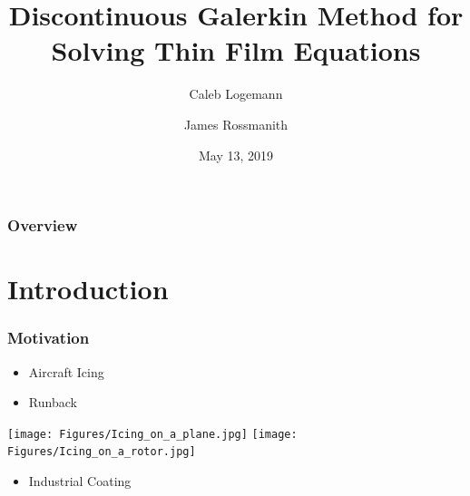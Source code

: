 \documentclass[10pt]{beamer}
\title[]{Discontinuous Galerkin Method for Solving Thin Film Equations} %
\author{Caleb Logemann \and James Rossmanith} %
\institute[Iowa State University]{%
Mathematics Department,\\ Iowa State University \\ %
\medskip
\textit{logemann@iastate.edu}} %
\date{May 13, 2019} %
\begin{document}
  \begin{frame}
    \titlepage{}
  \end{frame}

  \begin{frame}
    \frametitle{Overview}
    \tableofcontents
  \end{frame}

  \section{Introduction}
    \begin{frame}
      \frametitle{Motivation}
      \begin{itemize}
        \item Aircraft Icing
        \item Runback
      \end{itemize}
      \begin{center}
        \texttt{[image: Figures/Icing\_on\_a\_plane.jpg]}
        \hspace{0.1in}
        \texttt{[image: Figures/Icing\_on\_a\_rotor.jpg]}
      \end{center}
      \begin{itemize}
        \item Industrial Coating
      \end{itemize}
    \end{frame}
\end{document}
